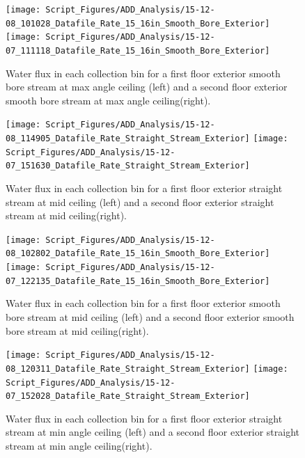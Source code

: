 \documentclass[12pt,oneside]{book}
\begin{document}
\begin{figure}[ht]
\texttt{[image: Script\_Figures/ADD\_Analysis/15-12-08\_101028\_Datafile\_Rate\_15\_16in\_Smooth\_Bore\_Exterior]}
\texttt{[image: Script\_Figures/ADD\_Analysis/15-12-07\_111118\_Datafile\_Rate\_15\_16in\_Smooth\_Bore\_Exterior]} \\ 
\caption[Water Flux for Smooth Bore Max Angle Varying Exterior Floor]{Water flux in each collection bin for a first floor exterior smooth bore stream at max angle ceiling (left) and a second floor exterior smooth bore stream at max angle ceiling(right).}
\label{fig:Exterior_First_Floor_Second_Floor_SB_Max}
\end{figure}

\begin{figure}[ht]
\texttt{[image: Script\_Figures/ADD\_Analysis/15-12-08\_114905\_Datafile\_Rate\_Straight\_Stream\_Exterior]}
\texttt{[image: Script\_Figures/ADD\_Analysis/15-12-07\_151630\_Datafile\_Rate\_Straight\_Stream\_Exterior]} \\ 
\caption[Water Flux for Straight Stream Mid Ceiling Varying Exterior Floor]{Water flux in each collection bin for a first floor exterior straight stream at mid ceiling (left) and a second floor exterior straight stream at mid ceiling(right).}
\label{fig:Exterior_First_Floor_Second_Floor_SS_Mid}
\end{figure}

\begin{figure}[ht]
\texttt{[image: Script\_Figures/ADD\_Analysis/15-12-08\_102802\_Datafile\_Rate\_15\_16in\_Smooth\_Bore\_Exterior]}
\texttt{[image: Script\_Figures/ADD\_Analysis/15-12-07\_122135\_Datafile\_Rate\_15\_16in\_Smooth\_Bore\_Exterior]} \\ 
\caption[Water Flux for Smooth Bore Mid Ceiling Varying Exterior Floor]{Water flux in each collection bin for a first floor exterior smooth bore stream at mid ceiling (left) and a second floor exterior smooth bore stream at mid ceiling(right).}
\label{fig:Exterior_First_Floor_Second_Floor_SB_Mid}
\end{figure}

\begin{figure}[ht]
\texttt{[image: Script\_Figures/ADD\_Analysis/15-12-08\_120311\_Datafile\_Rate\_Straight\_Stream\_Exterior]}
\texttt{[image: Script\_Figures/ADD\_Analysis/15-12-07\_152028\_Datafile\_Rate\_Straight\_Stream\_Exterior]} \\ 
\caption[Water Flux for Straight Stream Min Angle Ceiling Varying Exterior Floor]{Water flux in each collection bin for a first floor exterior straight stream at min angle ceiling (left) and a second floor exterior straight stream at min angle ceiling(right).}
\label{fig:Exterior_First_Floor_Second_Floor_SS_MAC}
\end{figure}
\end{document}
